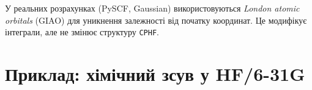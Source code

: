 \begin{commentbox}
У реальних розрахунках (PySCF, Gaussian) використовуються \emph{London atomic orbitals} (GIAO) для уникнення залежності від початку координат. Це модифікує інтеграли, але не змінює структуру \texttt{CPHF}.
\end{commentbox}

\section{Приклад: хімічний зсув у HF/6-31G}
